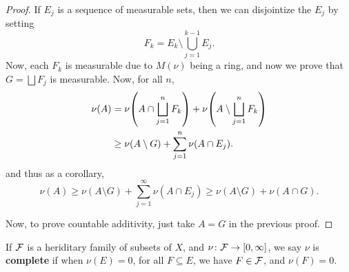\begin{proof}
    If $E_j$ is a sequence of measurable sets, then we can disjointize the $E_j$ by setting \[F_k = E_k \setminus \bigcup_{j = 1}^{k - 1} E_j.\] Now, each $F_k$ is measurable due to $M(\nu)$ being a ring, and now we prove that $G = \bigsqcup F_j$ is measurable. Now, for all $n$, \begin{align*}
        \nu(A) &= \nu\qty(A \cap \bigsqcup_{j = 1}^n F_k) + \nu\qty(A \setminus \bigsqcup_{j = 1}^n F_k)\\ 
        &\ge \nu(A \setminus G) + \sum_{j = 1}^n \nu(A \cap E_j).
    \end{align*}
    and thus as a corollary, \[\nu(A) \ge \nu(A \setminus G) + \sum_{j = 1}^\infty \nu(A \cap E_j) \ge \nu(A \setminus G) + \nu(A \cap G).\]

    Now, to prove countable additivity, just take $A = G$ in the previous proof.
\end{proof}

\begin{definition}
    If $\mathcal F$ is a heriditary family of subsets of $X$, and $\nu \colon \mathcal F \to [0, \infty]$, we say $\nu$ is \textbf{complete} if when $\nu(E) = 0$, for all $F \subseteq E$, we have $F \in \mathcal F$, and $\nu(F) = 0$.
\end{definition}